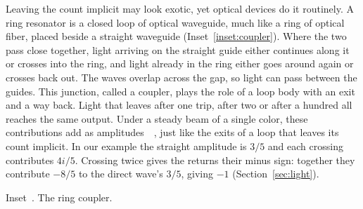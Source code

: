 \documentclass[acmsmall,screen,review,anonymous,nonacm]{acmart}
\newcommand{\ringGuides}{\foreach \reach/\tint in {.16/5,.10/9,.05/14}{
    \fill[flipout!\tint] (-1.95,{-.15-\reach}) rectangle (1.95,{.15+\reach});
  }
  \foreach \width/\height/\tint in {.76/.165/8,.58/.145/15,.40/.125/26}{
    \fill[flipout!50!flipback,opacity=\tint/100]
      (0,.25) ellipse[x radius=\width,y radius=\height];
  }
  \begin{scope}[shift={(0,.14)}]
    \foreach \reach/\tint in {.16/5,.10/9,.05/14}{
      \fill[flipback,opacity=\tint/100,even odd rule]
        (0,1.31) circle[radius={1.10+\reach}] (0,1.31) circle[radius={.80-\reach}];
    }
    \filldraw[draw=flipback,fill=flipback!12,line width=.55pt,even odd rule]
      (0,1.31) circle (1.10) (0,1.31) circle (.80);
  \end{scope}
  \fill[flipout!10] (-1.95,-.15) rectangle (1.95,.15);
  \draw[flipout,line width=.55pt] (-1.95,-.15)--(1.95,-.15)
                                 (-1.95,.15)--(1.95,.15);
}
\newcommand{\sideCoupledRing}{\ringGuides
  \begin{scope}[shift={(0,.14)},declare function={ringrad(\a)=.95-.080*cos(8*\a);}]
    \draw[flipback,wave head=.28,line width=.65pt,samples=240,domain=0:360,variable=\a]
      plot ({ringrad(\a)*cos(\a)},{1.31+ringrad(\a)*sin(\a)});
  \end{scope}
  \begin{scope}[declare function={
      mixangle(\x)=acos(.6)*(.5+.5*sin(90*max(-1,min(1,\x/.62))));
      busfield(\x)=.115*(cos(mixangle(\x))-2*sin(mixangle(\x)))*sin(360*\x/1.30);}]
    \draw[flipout,wave head=.34,line width=.7pt,samples=95,domain=-1.95:0]
      plot (\x,{busfield(\x)});
    \draw[ink,wave head=.66,line width=.7pt,samples=95,domain=0:1.95]
      plot (\x,{busfield(\x)});
  \end{scope}
}
\numberwithin{equation}{section}
\begin{document}
\par\medskip\noindent\begin{minipage}[c]{.72\linewidth}
\setlength{\parindent}{1em}\indent
Leaving the count implicit may look exotic, yet optical devices do it routinely. A ring resonator is a closed loop of optical waveguide,
much like a ring of optical fiber, placed beside a straight waveguide
(Inset~\ref{inset:coupler}). Where the two pass close together, light arriving on the
straight guide either continues along it or crosses into the ring,
and light already in the ring either goes around again or crosses
back out. The waves overlap across the gap, so light can pass between the guides.
This junction, called a coupler, plays the role of a loop body with an exit
and a way back. Light that leaves after one trip, after two or after
a hundred all reaches the same output. Under a steady beam of a single
color, these contributions add as
amplitudes~\cite[Eq.~(6)]{Alsing17RingLoss}~\cite[\S~5.3]{AndresMartinez22Thesis},
just like the exits of a loop that leaves its count implicit. In our example the straight amplitude is $3/5$ and each crossing contributes $4i/5$. Crossing twice gives the returns their minus sign: together they contribute $-8/5$ to the direct wave's $3/5$, giving $-1$
(Section~\ref{sec:light}).
\end{minipage}\hfill
\begin{minipage}[c]{.26\linewidth}\centering
{}\par\smallskip
{}\label{inset:coupler}
{\small Inset~\theringinset. The ring coupler.}
\end{minipage}\par\medskip
\end{document}
